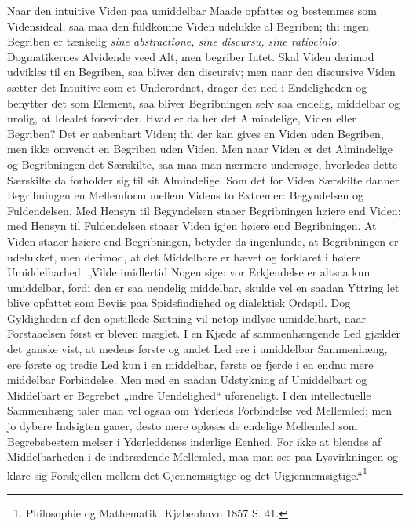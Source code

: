 \documentclass[11pt]{book}
\newcommand{\opage}[1]{\marginnote{\footnotesize\textit{[#1]}}}
\begin{document}
Naar den intuitive Viden paa umiddelbar Maade opfattes og bestemmes som
Vidensideal, saa maa den fuldkomne Viden udelukke al Begriben; thi
ingen Begriben er tænkelig \textit{sine abstractione, sine discursu,
sine ratiocinio}: Dogmatikernes Alvidende veed Alt, men begriber Intet.
Skal Viden derimod udvikles til en Begriben, saa bliver den discursiv;
men naar den discursive Viden sætter det Intuitive som et Underordnet,
drager det ned i Endeligheden og benytter det som Element, saa bliver
Begribningen selv saa endelig, middelbar og urolig, at Idealet
forsvinder. Hvad er da her det Almindelige, Viden eller Begriben? Det
er aabenbart Viden; thi der kan gives en Viden uden Begriben, men ikke
omvendt en Begriben uden Viden. Men naar Viden er det Almindelige og
Begribningen det Særskilte, saa maa man nærmere undersøge, hvorledes
dette Særskilte da forholder sig til sit Almindelige. Som det for Viden
Særskilte danner Begribningen en Mellemform mellem Videns to Extremer:
Begyndelsen og Fuldendelsen. Med Hensyn til Begyndelsen staaer
Begribningen høiere end Viden; med Hensyn til Fuldendelsen staaer Viden
igjen høiere end Begribningen. At Viden staaer høiere end Begribningen,
betyder da ingenlunde, at Begribningen er udelukket, men derimod, at
det Middelbare er hævet og forklaret i høiere Umiddelbarhed. „Vilde
imidlertid Nogen
\opage{254} \setcounter{footnote}{0}%
sige: vor Erkjendelse er altsaa kun umiddelbar, fordi den er saa
uendelig middelbar, skulde vel en saadan Yttring let blive opfattet som
Beviis paa Spidsfindighed og dialektisk Ordspil. Dog Gyldigheden af den
opstillede Sætning vil netop indlyse umiddelbart, naar Forstaaelsen
først er bleven mæglet. I en Kjæde af sammenhængende Led gjælder det
ganske vist, at medens første og andet Led ere i umiddelbar
Sammenhæng, ere første og tredie Led kun i en middelbar, første og
fjerde i en endnu mere middelbar Forbindelse. Men med en saadan
Udstykning af Umiddelbart og Middelbart er Begrebet „indre
Uendelighed“ uforeneligt. I den intellectuelle Sammenhæng taler man
vel ogsaa om Yderleds Forbindelse ved Mellemled; men jo dybere
Indsigten gaaer, desto mere opløses de endelige Mellemled som
Begrebsbestem\-%
melser i Yderleddenes inderlige Eenhed. For ikke at blendes af
Middelbarheden i de indtrædende Mellemled, maa man see paa
Lysvirkningen og klare sig Forskjellen mellem det Gjennemsigtige og det
Uigjennemsigtige.“\footnote{%
Philosophie og Mathematik. Kjøbenhavn 1857 S. 41.}
\end{document}

